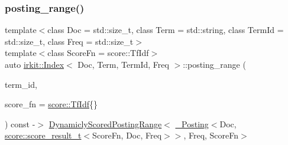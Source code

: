 \mbox{\label{classirkit_1_1Index_abeb1c1b2ddc660e42c5c6dad0bab4dc4}} 
\subsubsection{\texorpdfstring{posting\+\_\+range()}{posting\_range()}\hspace{0.1cm}{\footnotesize\ttfamily [2/2]}}
{\footnotesize\ttfamily template$<$class Doc  = std\+::size\+\_\+t, class Term  = std\+::string, class Term\+Id  = std\+::size\+\_\+t, class Freq  = std\+::size\+\_\+t$>$ \\
template$<$class Score\+Fn  = score\+::\+Tf\+Idf$>$ \\
auto \mbox{\hyperlink{classirkit_1_1Index}{irkit\+::\+Index}}$<$ Doc, Term, Term\+Id, Freq $>$\+::posting\+\_\+range (\begin{DoxyParamCaption}\item[{Term\+Id}]{term\+\_\+id,  }\item[{Score\+Fn}]{score\+\_\+fn = {\ttfamily \mbox{\hyperlink{structirkit_1_1score_1_1TfIdf}{score\+::\+Tf\+Idf}}\{\}} }\end{DoxyParamCaption}) const -\/$>$ \mbox{\hyperlink{classirkit_1_1DynamiclyScoredPostingRange}{Dynamicly\+Scored\+Posting\+Range}}$<$
            \mbox{\hyperlink{structirkit_1_1__Posting}{\+\_\+\+Posting}}$<$Doc, \mbox{\hyperlink{namespaceirkit_1_1score_ab6226695d6d5c54c84fcf2cb8e90c8b3}{score\+::score\+\_\+result\+\_\+t}}$<$Score\+Fn, Doc, Freq$>$$>$,
            Freq,
            Score\+Fn$>$
    \hspace{0.3cm}{\ttfamily [inline]}}

\mbox{\label{classirkit_1_1Index_ada30daf417b2dc957840170d90dba798}} 
